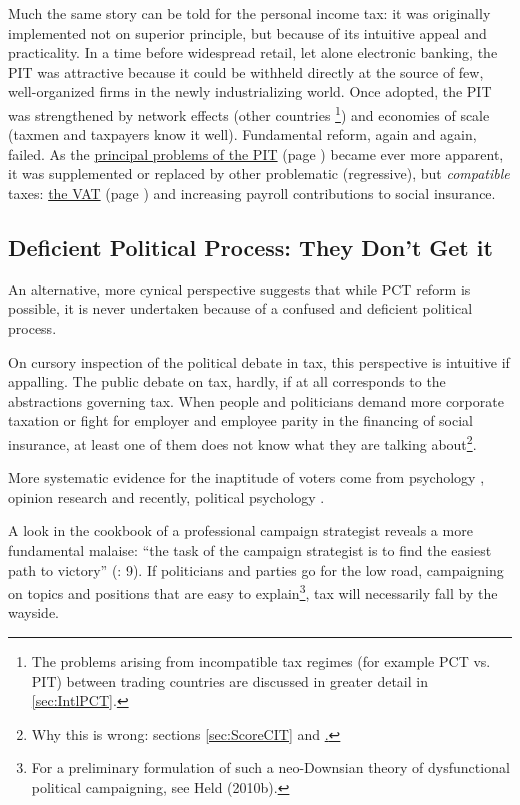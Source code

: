 Much the same story can be told for the personal income tax: it was originally implemented not on superior principle, but because of its intuitive appeal and practicality. In a time before widespread retail, let alone electronic banking, the PIT was attractive because it could be withheld directly at the source of few, well-organized firms in the newly industrializing world. Once adopted, the PIT was strengthened by network effects (other countries
	\footnote{
		The problems arising from incompatible tax regimes (for example PCT vs. PIT) between trading countries are discussed in greater detail in \autoref{sec:IntlPCT}.}) and economies of scale (taxmen and taxpayers know it well). Fundamental reform, again and again, failed. As the \hyperref[sec:ScorePIT]{principal problems of the PIT} (page \pageref{sec:ScorePIT}) became ever more apparent, it was supplemented or replaced by other problematic (regressive), but \emph{compatible} taxes: \hyperref[sec:ScoreVAT]{the VAT} (page \pageref{sec:ScoreVAT}) and increasing payroll contributions to social insurance. 

\subsection[Deficient Political Process]{Deficient Political Process: They Don't Get it} An alternative, more cynical perspective suggests that while PCT reform is possible, it is never undertaken because of a confused and deficient political process.

On cursory inspection of the political debate in tax, this perspective is intuitive if appalling. The public debate on tax, hardly, if at all corresponds to the abstractions governing tax. When people and politicians demand more corporate taxation or fight for employer and employee parity in the financing of social insurance, at least one of them does not know what they are talking about\footnote{Why this is wrong: sections \ref{sec:ScoreCIT} and \href{sec:SICAreTaxes}.}. 

More systematic evidence for the inaptitude of voters come from psychology \citep{Converse-1970-aa}, opinion research \citep{Delli-CarpiniKeeter-1996-aa} and recently, political psychology \citep{Rosenberg-2002-aa}. 

A look in the cookbook of a professional campaign strategist reveals a more fundamental malaise: ``the task of the campaign strategist is to find the easiest path to victory'' (\citealt{Malchow2003}: 9). If politicians and parties go for the low road, campaigning on topics and positions that are easy to explain\footnote{For a preliminary formulation of such a neo-Downsian theory of dysfunctional political campaigning, see Held (2010b).}, tax will necessarily fall by the wayside. 

